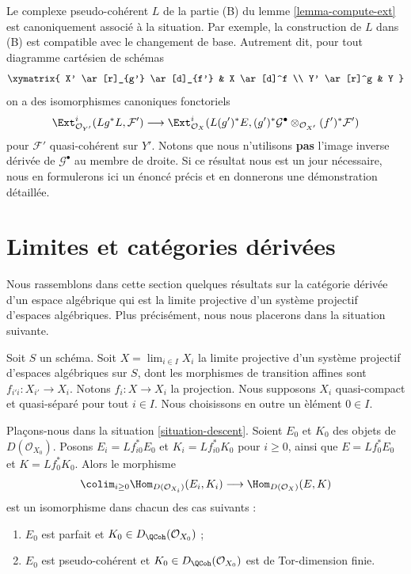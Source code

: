 \begin{remark}
\label{remark-base-change-of-L}
Le complexe pseudo-coh\'erent $L$ de la partie (B) du lemme
\ref{lemma-compute-ext} est canoniquement associ\'e \`a la situation. Par
exemple, la construction de $L$ dans (B) est compatible avec le changement de
base. Autrement dit, pour tout diagramme cart\'esien de sch\'emas
$$
\xymatrix{
X' \ar[r]_{g'} \ar[d]_{f'} &
X \ar[d]^f \\
Y' \ar[r]^g &
Y
}
$$
on a des isomorphismes canoniques fonctoriels
$$
\Ext^i_{\mathcal{O}_{Y'}}(Lg^*L, \mathcal{F}') \longrightarrow
\Ext^i_{\mathcal{O}_X}(L(g')^*E,
(g')^*\mathcal{G}^\bullet \otimes_{\mathcal{O}_{X'}} (f')^*\mathcal{F}')
$$
pour $\mathcal{F}'$ quasi-coh\'erent sur $Y'$. Notons que nous n'utilisons
{\bf pas} l'image inverse d\'eriv\'ee de $\mathcal{G}^\bullet$ au membre de
droite. Si ce r\'esultat nous est un jour n\'ecessaire, nous en formulerons ici
un \'enonc\'e pr\'ecis et en donnerons une d\'emonstration d\'etaill\'ee.
\end{remark}

\section{Limites et cat\'egories d\'eriv\'ees}
\label{section-limits}

\noindent
Nous rassemblons dans cette section quelques r\'esultats sur la cat\'egorie
d\'eriv\'ee d'un espace alg\'ebrique qui est la limite projective d'un syst\`eme
projectif d'espaces alg\'ebriques. Plus pr\'ecis\'ement, nous nous placerons dans
la situation suivante.

\begin{situation}
\label{situation-descent}
Soit $S$ un sch\'ema. Soit $X=\lim_{i\in I}X_i$ la limite projective d'un syst\`eme
projectif d'espaces alg\'ebriques sur $S$, dont les morphismes de transition
affines sont $f_{i'i}:X_{i'}\to X_i$. Notons $f_i:X\to X_i$ la projection.
Nous supposons $X_i$ quasi-compact et quasi-s\'epar\'e pour tout $i\in I$.
Nous choisissons en outre un \`el\'ement $0\in I$.
\end{situation}

\begin{lemma}
\label{lemma-descend-homomorphisms}
Pla\c{c}ons-nous dans la situation \ref{situation-descent}. Soient $E_0$ et
$K_0$ des objets de $D(\mathcal{O}_{X_0})$. Posons
$E_i=Lf_{i0}^*E_0$ et $K_i=Lf_{i0}^*K_0$ pour $i\geq0$, ainsi que
$E=Lf_0^*E_0$ et $K=Lf_0^*K_0$. Alors le morphisme
$$
\colim_{i \geq 0} \Hom_{D(\mathcal{O}_{X_i})}(E_i, K_i)
\longrightarrow
\Hom_{D(\mathcal{O}_X)}(E, K)
$$
est un isomorphisme dans chacun des cas suivants :
\begin{enumerate}
\item $E_0$ est parfait et $K_0\in D_\QCoh(\mathcal{O}_{X_0})$ ;
\item $E_0$ est pseudo-coh\'erent et
$K_0\in D_\QCoh(\mathcal{O}_{X_0})$ est de Tor-dimension finie.
\end{enumerate}
\end{lemma}

